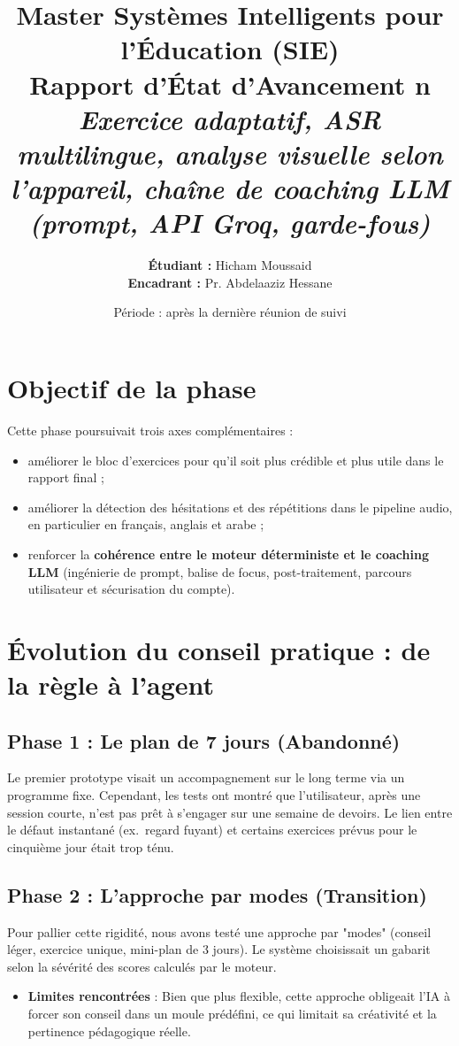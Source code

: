 ﻿\documentclass[12pt,a4paper]{article}
\title{
    \vspace{-2cm}
    \large Master Systèmes Intelligents pour l'Éducation (SIE)\\
    \vspace{0.5cm}
    \huge \textbf{Rapport d'État d'Avancement n\textdegree4}\\
    \large \textit{Exercice adaptatif, ASR multilingue, analyse visuelle selon l'appareil, chaîne de coaching LLM (prompt, API Groq, garde-fous)}
}
\author{\textbf{Étudiant :} Hicham Moussaid \\ \textbf{Encadrant :} Pr. Abdelaaziz Hessane}
\date{Période : après la dernière réunion de suivi}
\begin{document}
\maketitle

\section{Objectif de la phase}
Cette phase poursuivait trois axes complémentaires :
\begin{itemize}
    \item améliorer le bloc d'exercices pour qu'il soit plus crédible et plus utile dans le rapport final ;
    \item améliorer la détection des hésitations et des répétitions dans le pipeline audio, en particulier en français, anglais et arabe ;
    \item renforcer la \textbf{cohérence entre le moteur déterministe et le coaching LLM} (ingénierie de prompt, balise de focus, post-traitement, parcours utilisateur et sécurisation du compte).
\end{itemize}

\section{Évolution du conseil pratique : de la règle à l'agent}

\subsection{Phase 1 : Le plan de 7 jours (Abandonné)}
Le premier prototype visait un accompagnement sur le long terme via un programme fixe. Cependant, les tests ont montré que l'utilisateur, après une session courte, n'est pas prêt à s'engager sur une semaine de devoirs. Le lien entre le défaut instantané (ex.\ regard fuyant) et certains exercices prévus pour le cinquième jour était trop ténu.

\subsection{Phase 2 : L'approche par modes (Transition)}
Pour pallier cette rigidité, nous avons testé une approche par "modes" (conseil léger, exercice unique, mini-plan de 3 jours). Le système choisissait un gabarit selon la sévérité des scores calculés par le moteur. 
\begin{itemize}
    \item \textbf{Limites rencontrées} : Bien que plus flexible, cette approche obligeait l'IA à forcer son conseil dans un moule prédéfini, ce qui limitait sa créativité et la pertinence pédagogique réelle.
\end{itemize}
\end{document}
